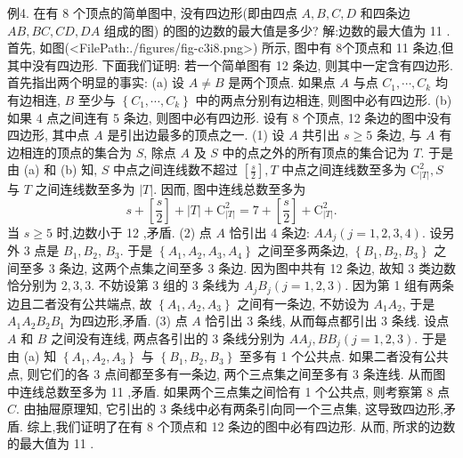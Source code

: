 例4. 在有 8 个顶点的简单图中, 没有四边形(即由四点 $A, B, C, D$ 和四条边 $A B, B C, C D, D A$ 组成的图) 的图的边数的最大值是多少? 
解:边数的最大值为 11 .
首先, 如图(<FilePath:./figures/fig-c3i8.png>) 所示, 图中有 8个顶点和 11 条边,但其中没有四边形.
下面我们证明: 若一个简单图有 12 条边, 则其中一定含有四边形.
首先指出两个明显的事实:
(a) 设 $A \neq B$ 是两个顶点.
如果点 $A$ 与点 $C_1, \cdots, C_k$ 均有边相连, $B$ 至少与 $\left\{C_1, \cdots, C_k\right\}$ 中的两点分别有边相连, 则图中必有四边形.
(b) 如果 4 点之间连有 5 条边, 则图中必有四边形.
设有 8 个顶点, 12 条边的图中没有四边形, 其中点 $A$ 是引出边最多的顶点之一.
(1) 设 $A$ 共引出 $s \geqslant 5$ 条边, 与 $A$ 有边相连的顶点的集合为 $S$, 除点 $A$ 及 $S$ 中的点之外的所有顶点的集合记为 $T$. 于是由 (a) 和 (b) 知, $S$ 中点之间连线数不超过 $\left[\frac{s}{2}\right], T$ 中点之间连线数至多为 $\mathrm{C}_{|T|}^2, S$ 与 $T$ 之间连线数至多为 $|T|$. 因而, 图中连线总数至多为
$$
s+\left[\frac{s}{2}\right]+|T|+\mathrm{C}_{|T|}^2=7+\left[\frac{s}{2}\right]+\mathrm{C}_{|T|}^2 .
$$
当 $s \geqslant 5$ 时,边数小于 12 ,矛盾.
(2) 点 $A$ 恰引出 4 条边: $A A_j(j=1,2,3,4)$. 设另外 3 点是 $B_1, B_2$, $B_3$. 于是 $\left\{A_1, A_2, A_3, A_4\right\}$ 之间至多两条边, $\left\{B_1, B_2, B_3\right\}$ 之间至多 3 条边, 这两个点集之间至多 3 条边.
因为图中共有 12 条边, 故知 3 类边数恰分别为 $2,3,3$. 不妨设第 3 组的 3 条线为 $A_j B_j(j=1,2,3)$. 因为第 1 组有两条边且二者没有公共端点, 故 $\left\{A_1, A_2, A_3\right\}$ 之间有一条边, 不妨设为 $A_1 A_2$, 于是 $A_1 A_2 B_2 B_1$ 为四边形,矛盾.
(3) 点 $A$ 恰引出 3 条线, 从而每点都引出 3 条线.
设点 $A$ 和 $B$ 之间没有连线, 两点各引出的 3 条线分别为 $A A_j, B B_j(j=1,2,3)$. 于是由 (a) 知
$\left\{A_1, A_2, A_3\right\}$ 与 $\left\{B_1, B_2, B_3\right\}$ 至多有 1 个公共点.
如果二者没有公共点, 则它们的各 3 点间都至多有一条边, 两个三点集之间至多有 3 条连线.
从而图中连线总数至多为 11 ,矛盾.
如果两个三点集之间恰有 1 个公共点, 则考察第 8 点 $C$. 由抽屉原理知, 它引出的 3 条线中必有两条引向同一个三点集, 这导致四边形,矛盾.
综上,我们证明了在有 8 个顶点和 12 条边的图中必有四边形.
从而, 所求的边数的最大值为 11 .



